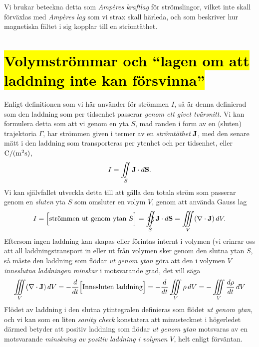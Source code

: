 Vi brukar beteckna detta som {\it Amp{\`e}res kraftlag} f{\"o}r str{\"o}mslingor,
vilket inte skall f{\"o}rv{\"a}xlas med {\it Amp{\`e}res lag} som vi strax skall
h{\"a}rleda, och som beskriver hur magnetiska f{\"a}ltet i sig kopplar till en
str{\"o}mt{\"a}thet.
\vfill\eject

\section{{\hl{Volymstr{\"o}mmar och ``lagen om att laddning inte kan
  f{\"o}rsvinna''}}}
Enligt definitionen som vi h{\"a}r anv{\"a}nder f{\"o}r str{\"o}mmen $I$, s{\aa}
{\"a}r denna definierad som den laddning som per tidsenhet passerar {\it genom
ett givet tv{\"a}rsnitt}. Vi kan formulera detta som att vi genom en yta $S$,
mad randen i form av en (sluten) trajektoria $\Gamma$, har str{\"o}mmen given
i termer av en {\it str{\"o}mt{\"a}thet} ${\bf J}$, med den senare m{\"a}tt i
den laddning som transporteras per ytenhet och per tidsenhet, eller
${\rm C}/({\rm m}^2{\rm s})$,
\hl{$$
  I=\iint_S {\bf J}\cdot d{\bf S}.
$$}
Vi kan sj{\"a}lvfallet utveckla detta till att g{\"a}lla den totala str{\"o}m
som passerar genom en {\it sluten} yta $S$ som omsluter en volym $V$, genom att
anv{\"a}nda Gauss lag
\hl{$$
  I=\Big[\hbox{str{\"o}mmen ut genom ytan $S$}\Big]
   =\oiint_S {\bf J}\cdot d{\bf S}
   =\iiint_V (\nabla\cdot{\bf J})\,dV.
$$}
Eftersom ingen laddning kan skapas eller f{\"o}rintas internt i volymen (vi
erinrar oss att all laddnings\-transport in eller ut fr{\aa}n volymen sker
genom den slutna ytan $S$, s{\aa} m{\aa}ste den laddning som fl{\"o}dar
{\it ut genom ytan} g{\"o}ra att den i volymen $V$ {\it inneslutna laddningen
minskar} i motsvarande grad, det vill s{\"a}ga
\hl{$$
  \iiint_V (\nabla\cdot{\bf J})\,dV
    =-{{d}\over{dt}}\Big[\hbox{Innesluten laddning}\Big]
    =-{{d}\over{dt}}\iiint_V \rho\,dV
    =-\iiint_V {{d\rho}\over{dt}}\,dV
$$}
Fl{\"o}det av laddning i den slutna ytintegralen definieras som fl{\"o}det
{\it ut genom ytan}, och vi kan som en liten {\it sanity check} konstatera att
minustecknet i h{\"o}gerledet d{\"a}rmed betyder att positiv laddning som
fl{\"o}dar {\it ut genom ytan} motsvaras av en motsvarande {\it minskning av
positiv laddning i volymen} $V$, helt enligt f{\"o}rv{\"a}ntan.

